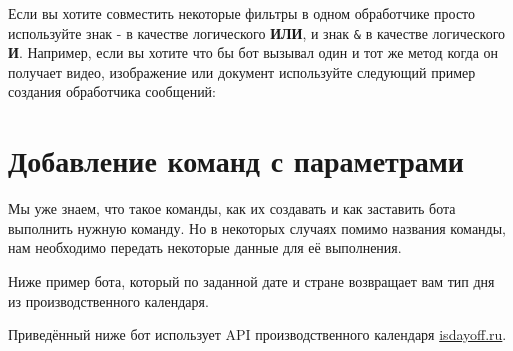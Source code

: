 \documentclass[
]{book}
\newenvironment{Shaded}{\begin{snugshade}}{\end{snugshade}}
\newcommand{\FunctionTok}[1]{\textcolor[rgb]{0.00,0.00,0.00}{#1}}
\newcommand{\NormalTok}[1]{#1}
\newcommand{\OtherTok}[1]{\textcolor[rgb]{0.56,0.35,0.01}{#1}}
\newcommand{\SpecialCharTok}[1]{\textcolor[rgb]{0.00,0.00,0.00}{#1}}
\begin{document}
Если вы хотите совместить некоторые фильтры в одном обработчике просто используйте знак \texttt{\textbar{}} - в качестве логического \textbf{ИЛИ}, и знак \texttt{\&} в качестве логического \textbf{И}. Например, если вы хотите что бы бот вызывал один и тот же метод когда он получает видео, изображение или документ используйте следующий пример создания обработчика сообщений:

\begin{Shaded}
\end{Shaded}

\hypertarget{ux434ux43eux431ux430ux432ux43bux435ux43dux438ux435-ux43aux43eux43cux430ux43dux434-ux441-ux43fux430ux440ux430ux43cux435ux442ux440ux430ux43cux438}{%
\section{Добавление команд с параметрами}\label{ux434ux43eux431ux430ux432ux43bux435ux43dux438ux435-ux43aux43eux43cux430ux43dux434-ux441-ux43fux430ux440ux430ux43cux435ux442ux440ux430ux43cux438}}

Мы уже знаем, что такое команды, как их создавать и как заставить бота выполнить нужную команду. Но в некоторых случаях помимо названия команды, нам необходимо передать некоторые данные для её выполнения.

Ниже пример бота, который по заданной дате и стране возвращает вам тип дня из производственного календаря.

Приведённый ниже бот использует API производственного календаря \href{https://isdayoff.ru/}{isdayoff.ru}.
\end{document}
